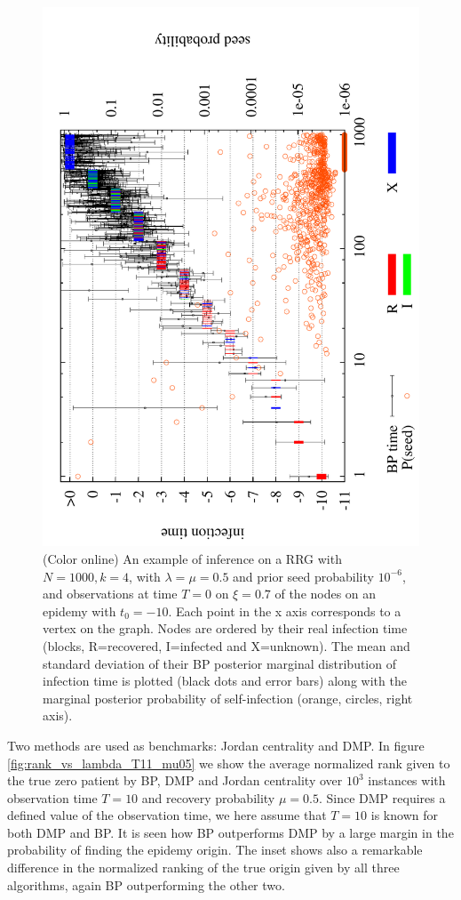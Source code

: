 \begin{figure}
\includegraphics[height=1.0\columnwidth, angle=270]{zero_patient/infertimes}
\caption{(Color online) An example of inference on a RRG with $N=1000,k=4$, with $\lambda=\mu=0.5$ and prior seed probability $10^{-6}$, and observations at time $T=0$ on $\xi=0.7$ of the nodes on an epidemy with $t_0=-10$. Each point in the x axis corresponds to a vertex on the graph. Nodes are ordered by their real infection time (blocks, R=recovered, I=infected and X=unknown). The mean and standard deviation of their BP posterior marginal distribution of infection time is plotted (black dots and error bars) along with the marginal posterior probability of self-infection (orange, circles, right axis).\label{fig:infertimes} }
\end{figure}

Two methods are used as benchmarks: Jordan centrality \cite{shah_detecting_2010,shah_rumors_2011,comin_identifying_2011} and DMP. In figure \ref{fig:rank_vs_lambda_T11_mu05} we show the average normalized rank given to the true zero patient by BP, DMP and Jordan centrality over $10^3$ instances with observation time $T=10$ and recovery probability $\mu=0.5$. Since DMP requires a defined value of the observation time, we here assume that $T=10$ is known for both DMP and BP. It is seen how BP outperforms DMP by a large margin in the probability of finding the epidemy origin. The inset shows also a remarkable difference in the normalized ranking of the true origin given by all three algorithms, again BP outperforming the other two.


